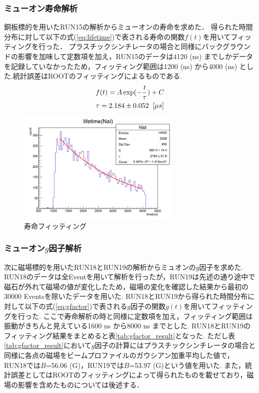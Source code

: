 
\subsubsection{ミューオン寿命解析}

銅板標的を用いたRUN15の解析からミューオンの寿命を求めた．
得られた時間分布に対して以下の式(\ref{eq:lifetime})で表される寿命の関数$f(t)$を用いてフィッティングを行った．
プラスチックシンチレータの場合と同様にバックグラウンドの影響を加味して定数項を加え，RUN15のデータは4120 (ns) までしかデータを記録していなかったため，フィッティング範囲は1200 (ns) から4000 (ns) とした.統計誤差はROOTのフィッティングによるものである.
\begin{gather}
  f(t) = A\exp(-\frac{t}{\tau})+C \label{eq:lifetime}\\
  \tau = 2.184 \pm 0.052 \;\;[\mu s] \notag
\end{gather}
\begin{figure}[H]
  \centering
    \includegraphics[width  = 0.7\textwidth]{figure/mino/lifetime_NaI_ratio.png}
    \caption{寿命フィッティング}
\end{figure}


\subsubsection{ミューオン$g$因子解析}

次に磁場標的を用いたRUN18とRUN19の解析からミュオンの$g$因子を求めた.
RUN18のデータは全Eventを用いて解析を行ったが，RUN19は先述の通り途中で磁石が外れて磁場の値が変化したため，磁場の変化を確認した結果から最初の30000 Eventsを除いたデータを用いた.
RUN18とRUN19から得られた時間分布に対して以下の式(\ref{eq:gfactor})で表される$g$因子の関数$g(t)$を用いてフィッティングを行った.
ここで寿命解析の時と同様に定数項を加え，フィッティング範囲は振動がきちんと見えている1600 ns から8000 ns までとした.
RUN18とRUN19のフィッティング結果をまとめると表\ref{tab:gfactor_result}となった.
ただし表\ref{tab:gfactor_result}において$g$因子の計算にはプラスチックシンチレータの場合と同様に各点の磁場をビームプロファイルのガウシアン加重平均した値で，RUN18では$B$=56.06 (G)，RUN19では$B$=53.97 (G)という値を用いた.
また，統計誤差としてはROOTのフィッティングによって得られたものを載せており，磁場の影響を含めたものについては後述する．

